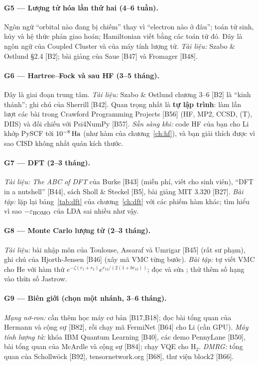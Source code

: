\paragraph{G5 --- Lượng tử hóa lần thứ hai (4--6 tuần).}
Ngôn ngữ ``orbital nào đang bị chiếm'' thay vì ``electron nào ở đâu''; toán tử sinh, hủy và hệ thức phản giao hoán; Hamiltonian viết bằng các toán tử đó. Đây là ngôn ngữ của Coupled Cluster và của máy tính lượng tử. \emph{Tài liệu:} Szabo \& Ostlund §2.4 [B2]; bài giảng của Saue [B47] và Fromager [B48].

\paragraph{G6 --- Hartree--Fock và sau HF (3--5 tháng).}
Đây là giai đoạn trung tâm. \emph{Tài liệu:} Szabo \& Ostlund chương 3--6 [B2] là ``kinh thánh''; ghi chú của Sherrill [B42]. Quan trọng nhất là \textbf{tự lập trình}: làm lần lượt các bài trong Crawford Programming Projects [B56] (HF, MP2, CCSD, (T), DIIS) và đối chiếu với Psi4NumPy [B57]. \emph{Sẵn sàng khi:} code HF của bạn cho Li khớp PySCF tới $10^{-8}\,\mathrm{Ha}$ (như hàm  của chương~\ref{ch:hf}), và bạn giải thích được vì sao CISD không nhất quán kích thước.

\paragraph{G7 --- DFT (2--3 tháng).}
\emph{Tài liệu:} \emph{The ABC of DFT} của Burke [B43] (miễn phí, viết cho sinh viên), ``DFT in a nutshell'' [B44], sách Sholl \& Steckel [B5], bài giảng MIT 3.320 [B27]. \emph{Bài tập:} lặp lại bảng~\ref{tab:dft} của chương~\ref{ch:dft} với các phiếm hàm khác; tìm hiểu vì sao $-\varepsilon_{\rm HOMO}$ của LDA sai nhiều như vậy.

\paragraph{G8 --- Monte Carlo lượng tử (2--3 tháng).}
\emph{Tài liệu:} bài nhập môn của Toulouse, Assaraf và Umrigar [B45] (rất sư phạm), ghi chú của Hjorth-Jensen [B46] (xây mã VMC từng bước). \emph{Bài tập:} tự viết VMC cho He với hàm thử $e^{-\zeta(r_1+r_2)}e^{r_{12}/(2(1+br_{12}))}$; đọc và sửa ; thử thêm số hạng vào thừa số Jastrow.

\paragraph{G9 --- Biên giới (chọn một nhánh, 3--6 tháng).}
\emph{Mạng nơ-ron:} cần thêm học máy cơ bản [B17,B18]; đọc bài tổng quan của Hermann và cộng sự [B82], rồi chạy mã FermiNet [B64] cho Li (cần GPU). \emph{Máy tính lượng tử:} khóa IBM Quantum Learning [B40], các demo PennyLane [B50], bài tổng quan của McArdle và cộng sự [B84]; chạy VQE cho H$_2$. \emph{DMRG:} tổng quan của Schollwöck [B92], tensornetwork.org [B68], thư viện block2 [B66].

